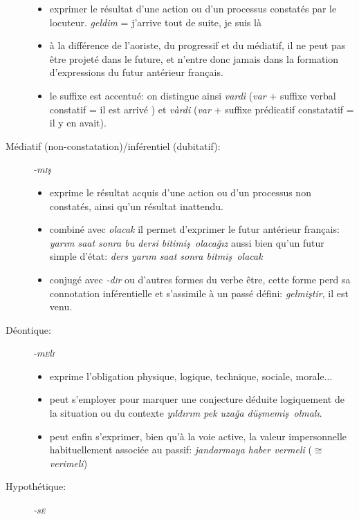\documentclass{cours}
\newcommand{\ch}{\c{s}}
\newcommand{\ug}{\u{g}}
\newcommand{\sci}{\textsc{i}}
\newcommand{\sce}{\textsc{e}}
\begin{document}
\begin{description}
          \begin{itemize}
              \item exprimer le résultat d'une action ou d'un processus constatés par le locuteur. \textsl{geldim} = j'arrive tout de suite, je suis là
              \item à la différence de l'aoriste, du progressif et du médiatif, il ne peut pas être projeté dans le future, et n'entre donc jamais dans la formation d'expressions du futur antérieur français.
              \item le suffixe est accentué: on distingue ainsi \textsl{vard\`i} (\textsl{var} + suffixe verbal constatif = \og il est arrivé \fg) et \textsl{v\`ardi} (\textsl{var} + suffixe prédicatif constatatif = \og il y en avait\fg).
          \end{itemize}
    \item [Médiatif (non-constatation)/inférentiel (dubitatif):] \textsl{-m\sci\ch}
          \begin{itemize}
              \item exprime le résultat acquis d'une action ou d'un processus non constatés, ainsi qu'un résultat inattendu.
              \item combiné avec \textsl{olacak} il permet d'exprimer le futur antérieur français: \textsl{yar\i m saat sonra bu dersi bitimi\ch \ olaca\ug \i z} aussi bien qu'un futur simple d'état: \textsl{ders yar\i m saat sonra bitmi\ch \ olacak}
              \item conjugé avec \textsl{-d\sci r} ou d'autres formes du verbe être, cette forme perd sa connotation inférentielle et s'assimile à un passé défini: \textsl{gelmi\ch tir}, il est venu.
          \end{itemize}
    \item [Déontique:] \textsl{-m\sce l\sci}
          \begin{itemize}
              \item exprime l'obligation physique, logique, technique, sociale, morale...
              \item peut s'employer pour marquer une conjecture déduite logiquement de la situation ou du contexte \textsl{y\i ld\i r\i m pek uza\ug a dü\ch memi\ch \ olmal\i}.
              \item peut enfin s'exprimer, bien qu'à la voie active, la valeur impersonnelle habituellement associée au passif: \textsl{jandarmaya haber vermeli} ($\cong$ \textsl{verimeli})
          \end{itemize}
    \item [Hypothétique:] \textsl{-s\sce}

\end{description}
\end{document}
